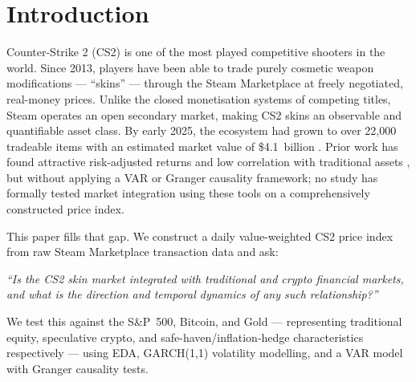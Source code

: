 \section{Introduction}
\label{sec:introduction}

Counter-Strike 2 (CS2) is one of the most played competitive shooters in the
world. Since 2013, players have been able to trade purely cosmetic weapon
modifications --- ``skins'' --- through the Steam Marketplace at freely
negotiated, real-money prices. Unlike the closed monetisation systems of
competing titles, Steam operates an open secondary market, making CS2 skins
an observable and quantifiable asset class. By early 2025, the ecosystem had
grown to over 22,000 tradeable items with an estimated market value of
\$4.1~billion \cite{guedefernandez2025ai}. Prior work has found attractive
risk-adjusted returns and low correlation with traditional assets
\cite{dobrynskaya2025videogame}, but without applying a VAR or Granger
causality framework; no study has formally tested market integration using
these tools on a comprehensively constructed price index.

This paper fills that gap. We construct a daily value-weighted CS2 price
index from raw Steam Marketplace transaction data and ask:

\textit{``Is the CS2 skin market integrated with traditional and crypto
financial markets, and what is the direction and temporal dynamics of any
such relationship?''}

We test this against the S\&P~500, Bitcoin, and Gold --- representing
traditional equity, speculative crypto, and safe-haven/inflation-hedge
characteristics respectively --- using
EDA, GARCH(1,1) volatility modelling, and a VAR model with Granger causality
tests.
